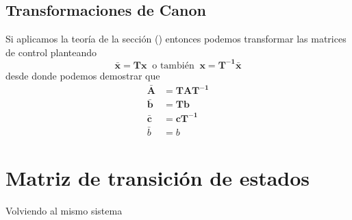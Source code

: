 \subsection{Transformaciones de Canon}
Si aplicamos la teoría de la sección () entonces podemos transformar
las matrices de control planteando
\begin{equation*}
    \bm{\bar{x}} = \bm{T} \bm{x} \; \; \text{o también} \; \;\bm{x} = \bm{T^{-1}} \bm{\bar{x}}
\end{equation*}
desde donde podemos demostrar que
\begin{equation*}
    \begin{split}
        \bm{\bar{A}} &= \bm{T} \bm{A} \bm{T^{-1}} \\
        \bm{\bar{b}} &= \bm{T} \bm{b} \\
        \bm{\bar{c}} &= \bm{c} \bm{T^{-1}} \\
        \bar{b} &= b
    \end{split}
\end{equation*}


\section*{Matriz de transición de estados}
Volviendo al mismo sistema












